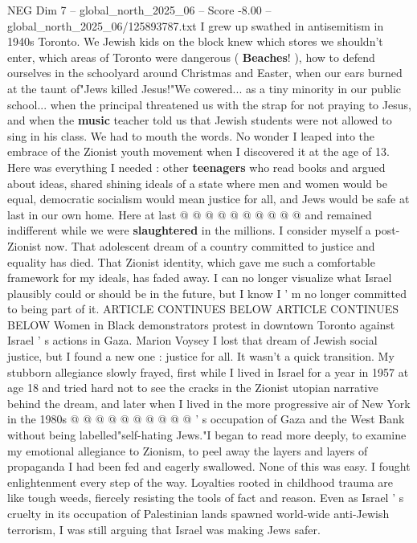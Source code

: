 \begin{textsample}{NEG Dim 7 – global\_north\_2025\_06 – Score -8.00 – global\_north\_2025\_06/125893787.txt}  \label{ex:f7_neg_079}
I grew up swathed in antisemitism in 1940s Toronto.
We Jewish kids on the block knew which stores we shouldn't enter, which areas of Toronto were dangerous ( \textbf{Beaches}! ), how to defend ourselves in the schoolyard around Christmas and Easter, when our ears burned at the taunt of"Jews killed Jesus!"We cowered... as a tiny minority in our public school... when the principal threatened us with the strap for not praying to Jesus, and when the \textbf{music} teacher told us that Jewish students were not allowed to sing in his class.
We had to mouth the words.
No wonder I leaped into the embrace of the Zionist youth movement when I discovered it at the age of 13.
Here was everything I needed : other \textbf{teenagers} who read books and argued about ideas, shared shining ideals of a state where men and women would be equal, democratic socialism would mean justice for all, and Jews would be safe at last in our own home.
Here at last @ @ @ @ @ @ @ @ @ @ and remained indifferent while we were \textbf{slaughtered} in the millions.
I consider myself a post-Zionist now.
That adolescent dream of a country committed to justice and equality has died.
That Zionist identity, which gave me such a comfortable framework for my ideals, has faded away.
I can no longer visualize what Israel plausibly could or should be in the future, but I know I ' m no longer committed to being part of it.
ARTICLE CONTINUES BELOW ARTICLE CONTINUES BELOW Women in Black demonstrators protest in downtown Toronto against Israel ' s actions in Gaza.
Marion Voysey I lost that dream of Jewish social justice, but I found a new one : justice for all.
It wasn't a quick transition.
My stubborn allegiance slowly frayed, first while I lived in Israel for a year in 1957 at age 18 and tried hard not to see the cracks in the Zionist utopian narrative behind the dream, and later when I lived in the more progressive air of New York in the 1980s @ @ @ @ @ @ @ @ @ @ ' s occupation of Gaza and the West Bank without being labelled"self-hating Jews."I began to read more deeply, to examine my emotional allegiance to Zionism, to peel away the layers and layers of propaganda I had been fed and eagerly swallowed.
None of this was easy.
I fought enlightenment every step of the way.
Loyalties rooted in childhood trauma are like tough weeds, fiercely resisting the tools of fact and reason.
Even as Israel ' s cruelty in its occupation of Palestinian lands spawned world-wide anti-Jewish terrorism, I was still arguing that Israel was making Jews safer.

\end{textsample}
